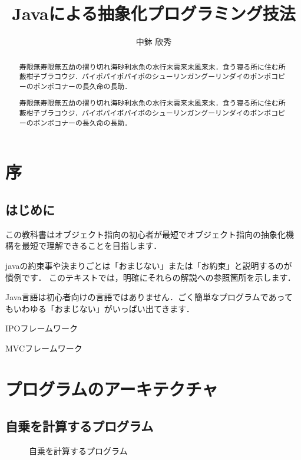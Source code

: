 \documentclass[a4j,papersize]{jsbook}
\title{Javaによる抽象化プログラミング技法}
\author{中鉢 欣秀}
\begin{document}
\maketitle

\chapter*{序}

\begin{abstract}
寿限無寿限無五劫の摺り切れ海砂利水魚の水行末雲来末風来末．食う寝る所に住む所藪柑子ブラコウジ．パイポパイポパイポのシューリンガングーリンダイのポンポコピーのポンポコナーの長久命の長助．
\end{abstract}

\section*{はじめに}

この教科書はオブジェクト指向の初心者が最短でオブジェクト指向の抽象化機
構を最短で理解できることを目指します．

javaの約束事や決まりごとは「おまじない」または「お約束」と説明するのが
慣例です．
このテキストでは，明確にそれらの解説への参照箇所を示します．

Java言語は初心者向けの言語ではありません．ごく簡単なプログラムであって
もいわゆる「おまじない」がいっぱい出てきます．

IPOフレームワーク

MVCフレームワーク

\chapter{プログラムのアーキテクチャ}

\begin{abstract}
寿限無寿限無五劫の摺り切れ海砂利水魚の水行末雲来末風来末．食う寝る所に住む所藪柑子ブラコウジ．パイポパイポパイポのシューリンガングーリンダイのポンポコピーのポンポコナーの長久命の長助．
\end{abstract}

\section{自乗を計算するプログラム}
\begin{figure}

\caption{自乗を計算するプログラム}\label{code:Square1:square:Square}
\end{figure}
\end{document}
